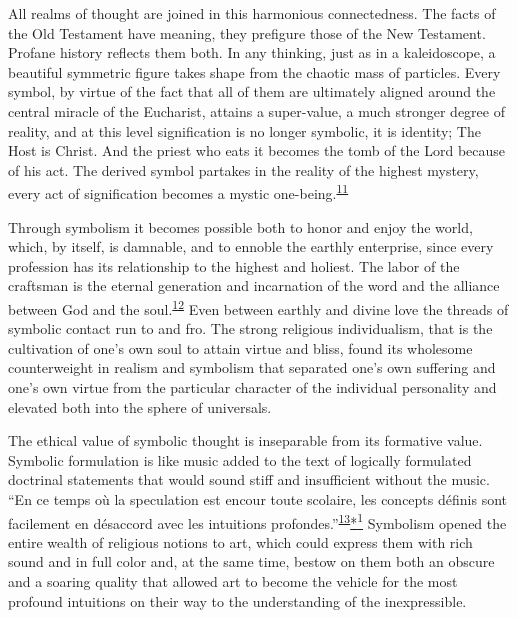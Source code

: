 All realms of thought are joined in this harmonious connectedness. The
facts of the Old Testament have meaning, they prefigure those of the New
Testament. Profane history reflects them both. In any thinking, just as
in a kaleidoscope, a beautiful symmetric figure takes shape from the
chaotic mass of particles. Every symbol, by virtue of the fact that all
of them are ultimately aligned around the central miracle of the
Eucharist, attains a super-value, a much stronger degree of reality, and
at this level signification is no longer symbolic, it is identity; The
Host is Christ. And the priest who eats it becomes the tomb of the Lord
because of his act. The derived symbol partakes in the reality of the
highest mystery, every act of signification becomes a mystic
one-being.\textsuperscript{\protect\hypertarget{16_Chapter_Nine__THE_DECLINE_OF_SYM.xhtmlux5cux23id_771}{\protect\hyperlink{23_NOTES.xhtmlux5cux23id_772}{11}}}

\protect\hypertarget{16_Chapter_Nine__THE_DECLINE_OF_SYM.xhtmlux5cux23page_240}{}{}Through
symbolism it becomes possible both to honor and enjoy the world, which,
by itself, is damnable, and to ennoble the earthly enterprise, since
every profession has its relationship to the highest and holiest. The
labor of the craftsman is the eternal generation and incarnation of the
word and the alliance between God and the
soul.\textsuperscript{\protect\hypertarget{16_Chapter_Nine__THE_DECLINE_OF_SYM.xhtmlux5cux23id_769}{\protect\hyperlink{23_NOTES.xhtmlux5cux23id_770}{12}}}
Even between earthly and divine love the threads of symbolic contact run
to and fro. The strong religious individualism, that is the cultivation
of one's own soul to attain virtue and bliss, found its wholesome
counterweight in realism and symbolism that separated one's own
suffering and one's own virtue from the particular character of the
individual personality and elevated both into the sphere of universals.

The ethical value of symbolic thought is inseparable from its formative
value. Symbolic formulation is like music added to the text of logically
formulated doctrinal statements that would sound stiff and insufficient
without the music. ``En ce temps où la speculation est encour toute
scolaire, les concepts définis sont facilement en désaccord avec les
intuitions
profondes.''\textsuperscript{\protect\hypertarget{16_Chapter_Nine__THE_DECLINE_OF_SYM.xhtmlux5cux23id_767}{\protect\hyperlink{23_NOTES.xhtmlux5cux23id_768}{13}}}\protect\hypertarget{16_Chapter_Nine__THE_DECLINE_OF_SYM.xhtmlux5cux23id_2573}{\protect\hyperlink{23_NOTES.xhtmlux5cux23id_2574}{*\textsuperscript{1}}}
Symbolism opened the entire wealth of religious notions to art, which
could express them with rich sound and in full color and, at the same
time, bestow on them both an obscure and a soaring quality that allowed
art to become the vehicle for the most profound intuitions on their way
to the understanding of the inexpressible.

